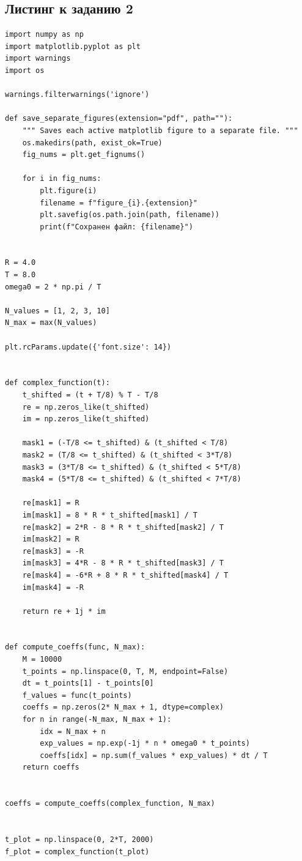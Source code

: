 \documentclass[a4paper, 12pt]{article}
\begin{document}
\subsection{Листинг к заданию 2}
\begin{verbatim}
import numpy as np
import matplotlib.pyplot as plt
import warnings
import os

warnings.filterwarnings('ignore')

def save_separate_figures(extension="pdf", path=""):
    """ Saves each active matplotlib figure to a separate file. """
    os.makedirs(path, exist_ok=True)
    fig_nums = plt.get_fignums()

    for i in fig_nums:
        plt.figure(i)
        filename = f"figure_{i}.{extension}"
        plt.savefig(os.path.join(path, filename))
        print(f"Сохранен файл: {filename}")


R = 4.0
T = 8.0
omega0 = 2 * np.pi / T

N_values = [1, 2, 3, 10]
N_max = max(N_values)

plt.rcParams.update({'font.size': 14})


def complex_function(t):
    t_shifted = (t + T/8) % T - T/8
    re = np.zeros_like(t_shifted)
    im = np.zeros_like(t_shifted)

    mask1 = (-T/8 <= t_shifted) & (t_shifted < T/8)
    mask2 = (T/8 <= t_shifted) & (t_shifted < 3*T/8)
    mask3 = (3*T/8 <= t_shifted) & (t_shifted < 5*T/8)
    mask4 = (5*T/8 <= t_shifted) & (t_shifted < 7*T/8)

    re[mask1] = R
    im[mask1] = 8 * R * t_shifted[mask1] / T
    re[mask2] = 2*R - 8 * R * t_shifted[mask2] / T
    im[mask2] = R
    re[mask3] = -R
    im[mask3] = 4*R - 8 * R * t_shifted[mask3] / T
    re[mask4] = -6*R + 8 * R * t_shifted[mask4] / T
    im[mask4] = -R

    return re + 1j * im


def compute_coeffs(func, N_max):
    M = 10000
    t_points = np.linspace(0, T, M, endpoint=False)
    dt = t_points[1] - t_points[0]
    f_values = func(t_points)
    coeffs = np.zeros(2* N_max + 1, dtype=complex)
    for n in range(-N_max, N_max + 1):
        idx = N_max + n
        exp_values = np.exp(-1j * n * omega0 * t_points)
        coeffs[idx] = np.sum(f_values * exp_values) * dt / T
    return coeffs


coeffs = compute_coeffs(complex_function, N_max)


t_plot = np.linspace(0, 2*T, 2000)
f_plot = complex_function(t_plot)


\end{verbatim}
\end{document}
